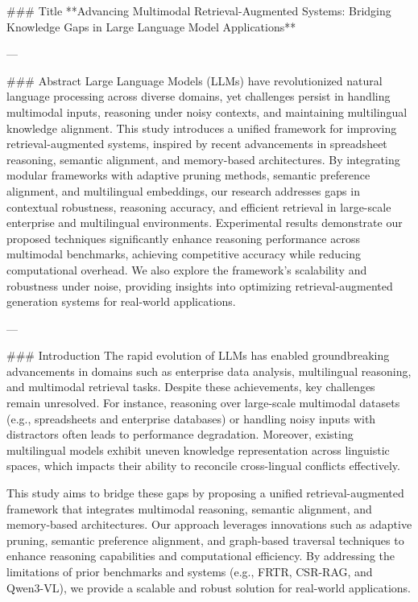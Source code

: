 ### Title  
**Advancing Multimodal Retrieval-Augmented Systems: Bridging Knowledge Gaps in Large Language Model Applications**

---

### Abstract  
Large Language Models (LLMs) have revolutionized natural language processing across diverse domains, yet challenges persist in handling multimodal inputs, reasoning under noisy contexts, and maintaining multilingual knowledge alignment. This study introduces a unified framework for improving retrieval-augmented systems, inspired by recent advancements in spreadsheet reasoning, semantic alignment, and memory-based architectures. By integrating modular frameworks with adaptive pruning methods, semantic preference alignment, and multilingual embeddings, our research addresses gaps in contextual robustness, reasoning accuracy, and efficient retrieval in large-scale enterprise and multilingual environments. Experimental results demonstrate our proposed techniques significantly enhance reasoning performance across multimodal benchmarks, achieving competitive accuracy while reducing computational overhead. We also explore the framework's scalability and robustness under noise, providing insights into optimizing retrieval-augmented generation systems for real-world applications.

---

### Introduction  
The rapid evolution of LLMs has enabled groundbreaking advancements in domains such as enterprise data analysis, multilingual reasoning, and multimodal retrieval tasks. Despite these achievements, key challenges remain unresolved. For instance, reasoning over large-scale multimodal datasets (e.g., spreadsheets and enterprise databases) or handling noisy inputs with distractors often leads to performance degradation. Moreover, existing multilingual models exhibit uneven knowledge representation across linguistic spaces, which impacts their ability to reconcile cross-lingual conflicts effectively.  

This study aims to bridge these gaps by proposing a unified retrieval-augmented framework that integrates multimodal reasoning, semantic alignment, and memory-based architectures. Our approach leverages innovations such as adaptive pruning, semantic preference alignment, and graph-based traversal techniques to enhance reasoning capabilities and computational efficiency. By addressing the limitations of prior benchmarks and systems (e.g., FRTR, CSR-RAG, and Qwen3-VL), we provide a scalable and robust solution for real-world applications.

